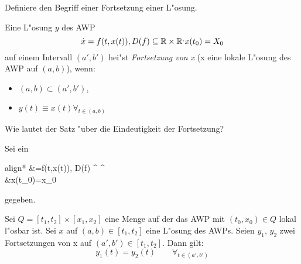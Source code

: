 \documentclass[9pt]{article}
\newcommand{\R}[1]{%
	\ifthenelse{\equal{#1}{}}
	{\mathbb{R}}
	{\mathbb{R}^{#1}}}%
\newenvironment{field}{}{\newpage}
\newif\ifnote
\newenvironment{note}{\notetrue}{\notefalse}
\newcommand{\localtag}{}
\newcommand{\globaltag}{}
\newcommand{\uuid}{}
\newcommand{\tags}[1]{
    \ifnote 
        \renewcommand{\localtag}{#1}
    \else
        \renewcommand{\globaltag}{#1}
    \fi 
    }
\newcommand{\xplain}[1]{\renewcommand{\uuid}{#1}}
\begin{document}
\begin{note}
	\xplain{bceb73cf-5355-453c-8021-a9f933e39c29}
	\tags{definition, fortsetzung, 3.5.1}
	
	\begin{field}  %
		Definiere den Begriff einer Fortsetzung einer L"osung. 
	\end{field}
	
	\begin{field}  %
		Eine L"osung $y$ des AWP 
		\begin{equation*}
		\dot{x}=f(t,x(t)), D(f) \subseteq \R{} \times \R, x(t_0)=X_0
		\end{equation*}
		auf einem Intervall $(a',b')$ hei"st \textit{Fortsetzung von x} (x eine lokale L"osung des AWP auf $(a,b)$), wenn:
		\begin{itemize}
			\item $(a,b) \subset (a',b')$,
			\item $y(t) \equiv x(t) \forall_{t\in (a,b)}$
		\end{itemize}
	\end{field}
\end{note}
\begin{note}
	\xplain{3bdb77e0-cab7-493d-b4ae-42e25fc283fb}
	\tags{satz, fortsetzung, 3.5.2}
	
	\begin{field}  %
		Wie lautet der Satz "uber die Eindeutigkeit der Fortsetzung?
	\end{field}
		
	\begin{field}  %
		Sei ein  
		\begin{empheq}[left= \text{AWP:~} \empheqlbrace]{align*}
		&=f(t,x(t)), D(f) \subseteq \R{} \times \R{} \\ 
		 &x(t_0)=x_0
		\end{empheq}
		gegeben.
		
		 Sei $Q=[t_1,t_2] \times [x_1,x_2]$ eine Menge auf der das AWP mit $(t_0, x_0) \in Q$
		lokal l"osbar ist. Sei $x$ auf $(a,b) \in [t_1,t_2]$ eine L"osung des AWPs. Seien $y_1$, $y_2$
		zwei Fortsetzungen von x auf $(a',b')\in [t_1,t_2]$. Dann gilt: 
		\begin{equation*}
		y_1(t) = y_2(t) \qquad \forall_{t\in (a',b')}
		\end{equation*}
	\end{field}
\end{note}
\end{document}
